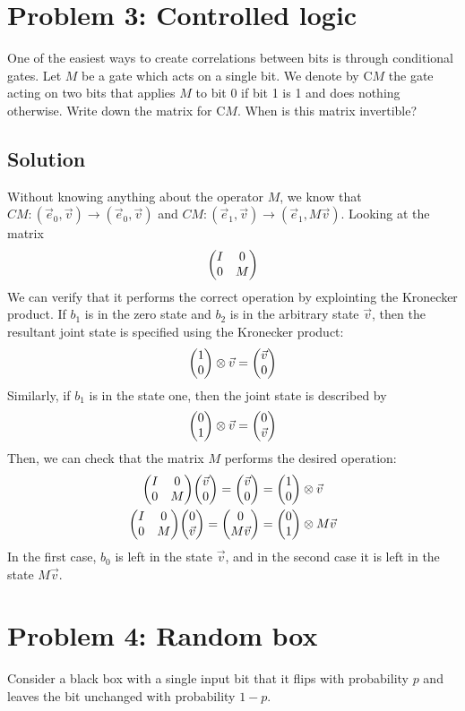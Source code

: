 \documentclass{article}
\begin{document}
\section*{Problem 3: Controlled logic}
One of the easiest ways to create correlations between bits is through conditional gates. Let $M$ be a gate which acts on a single bit. We denote by $\text{C}M$ the gate acting on two bits that applies $M$ to bit 0 if bit 1 is 1 and does nothing otherwise. Write down the matrix for $\text{C}M$. When is this matrix invertible?

\subsection*{Solution}
Without knowing anything about the operator $M$, we know that $CM: (\vec e_0,\vec v) \to (\vec e_0, \vec v)$ and $CM: (\vec e_1, \vec v) \to (\vec e_1, M\vec v)$. Looking at the matrix
$$
\mqty(I & 0 \\ 0 & M)
$$
We can verify that it performs the correct operation by explointing the Kronecker product. If $b_1$ is in the zero state and $b_2$ is in the arbitrary state $\vec v$, then the resultant joint state is specified using the Kronecker product:
$$
\mqty(1 \\ 0) \otimes \vec v = \mqty(\vec v \\ 0)
$$
Similarly, if $b_1$ is in the state one, then the joint state is described by
$$
\mqty(0 \\ 1) \otimes \vec v = \mqty(0 \\ \vec v)
$$
Then, we can check that the matrix $M$ performs the desired operation:
\begin{align*}
    \mqty(I & 0 \\ 0 & M)\mqty(\vec v \\ 0) = \mqty(\vec v \\ 0) &= \mqty(1 \\ 0) \otimes \vec v \\
     \mqty(I & 0 \\ 0 & M)\mqty(0 \\ \vec v) = \mqty(0 \\ M\vec v) &= \mqty(0 \\ 1) \otimes M\vec v
\end{align*}
In the first case, $b_0$ is left in the state $\vec v$, and in the second case it is left in the state $M\vec v$.

\section*{Problem 4: Random box}
Consider a black box with a single input bit that it flips with probability $p$ and leaves the bit unchanged with probability $1-p$. 
\end{document}
